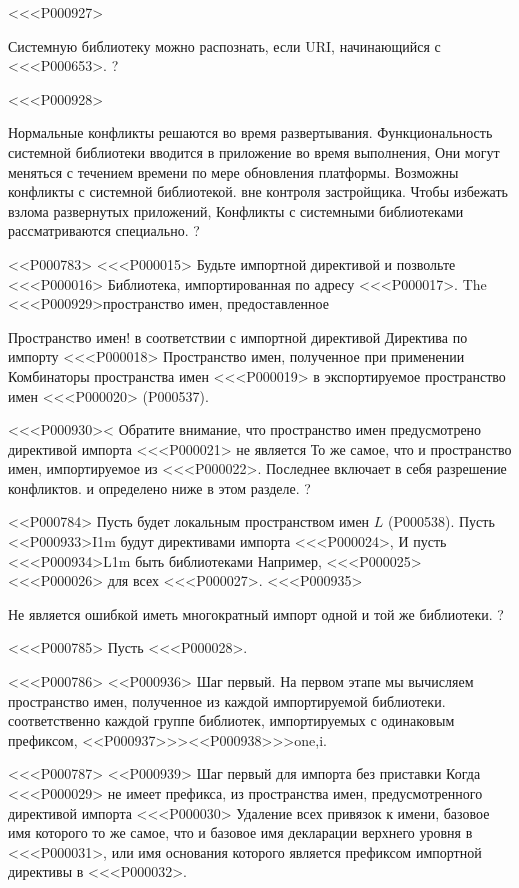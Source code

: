 {<<<P000927>{%
Системную библиотеку можно распознать, если
URI, начинающийся с <<<P000653>.%
?

<<<P000928>{%
Нормальные конфликты решаются во время развертывания.
Функциональность системной библиотеки
вводится в приложение во время выполнения,
Они могут меняться с течением времени по мере обновления платформы.
Возможны конфликты с системной библиотекой.
вне контроля застройщика.
Чтобы избежать взлома развернутых приложений,
Конфликты с системными библиотеками рассматриваются специально.
?

<<P000783>%
<<<P000015> Будьте импортной директивой и позвольте <<<P000016> Библиотека, импортированная по адресу <<<P000017>.
The
<<<P000929>{пространство имен, предоставленное}{%
Пространство имен! в соответствии с импортной директивой
Директива по импорту <<<P000018> Пространство имен, полученное при применении
Комбинаторы пространства имен <<<P000019>
в экспортируемое пространство имен <<<P000020>
(P000537).

<<<P000930><%
Обратите внимание, что пространство имен предусмотрено директивой импорта <<<P000021> не является
То же самое, что и пространство имен, импортируемое из <<<P000022>.
Последнее включает в себя разрешение конфликтов.
и определено ниже в этом разделе.%
?

<<P000784>%
Пусть  будет локальным пространством имен $L$
(P000538).
Пусть <<P000933>{I}{1}{m} будут директивами импорта <<<P000024>,
И пусть <<<P000934>{L}{1}{m} быть библиотеками
Например, <<<P000025> <<<P000026> для всех <<<P000027>.
<<<P000935>{%
Не является ошибкой иметь многократный импорт одной и той же библиотеки.
?

<<<P000785>%
Пусть <<<P000028>.

<<<P000786>%
<<P000936> Шаг первый.
На первом этапе мы вычисляем пространство имен, полученное из каждой импортируемой библиотеки.
соответственно каждой группе библиотек, импортируемых с одинаковым префиксом,
<<P000937>>>{<<P000938>>>{one},i}.

<<<P000787>%
<<P000939> Шаг первый для импорта без приставки
Когда <<<P000029> не имеет префикса, 
из пространства имен, предусмотренного директивой импорта <<<P000030>
Удаление всех привязок к имени, базовое имя которого
то же самое, что и базовое имя декларации верхнего уровня в <<<P000031>,
или имя основания которого является префиксом импортной директивы в <<<P000032>.

}}}}}
